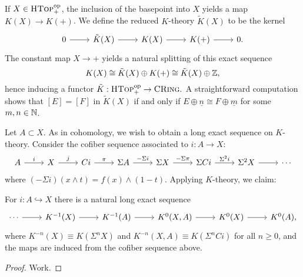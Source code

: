\documentclass{amsart}
\begin{document}
\begin{definition}
    If $X\in\textsc{HTop}^\text{op}_+$, the inclusion of the basepoint into $X$ yields a map
    $K(X)\to K(+)$. We define the reduced $K$-theory $\tilde K(X)$ to be the kernel
    \begin{equation*}
        \begin{tikzcd}
            0\rar & \tilde K(X)\rar & K(X)\rar & K(+)\rar & 0.
        \end{tikzcd}
    \end{equation*}
    The constant map $X\to +$ yields a natural splitting of this exact sequence
    \begin{equation*}
        K(X) \cong \tilde K(X)\oplus K(+)\cong \tilde K(X)\oplus \mathbb{Z},
    \end{equation*}
    hence inducing a functor $\tilde K:\textsc{HTop}^\text{op}_+\to\textsc{CRing}.$
    A straightforward computation shows that $[E]=[F]$ in $\tilde K(X)$ if and only if
    $E\oplus\underline{n}\cong F\oplus\underline{m}$ for some $m,n\in\mathbb{N}$.
\end{definition}

Let $A\subset X$. As in cohomology, we wish to obtain a long exact sequence on $K$-theory.
Consider the cofiber sequence associated to $i:A\to X$:
\begin{equation*}
    \begin{tikzcd}
        A\rar{i} & X\rar{j} & Ci\rar{\pi} & \Sigma A\rar{-\Sigma i} & \Sigma X\rar{-\Sigma\pi} & \Sigma Ci\rar{\Sigma^2 i} &\Sigma^2X\rar&\cdots
    \end{tikzcd}
\end{equation*}
where $(-\Sigma i)(x\wedge t)=f(x)\wedge(1-t)$. Applying $K$-theory, we claim:
\begin{proposition}
    For $i:A\hookrightarrow X$ there is a natural long exact sequence
    \begin{equation*}
        \begin{tikzcd}
            \cdots\rar & K^{-1}(X)\rar & K^{-1}(A)\rar & K^0(X,A)\rar & K^0(X)\rar & K^0(A),
        \end{tikzcd}
    \end{equation*}
    where $K^{-n}(X)\equiv K(\Sigma^n X)$ and $K^{-n}(X,A)\equiv K(\Sigma^n Ci)$ for all $n\geqslant0$,
    and the maps are induced from the cofiber sequence above.
\end{proposition}
\begin{proof}
    Work.
\end{proof}
\end{document}
